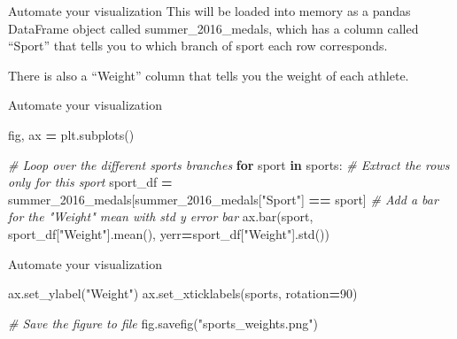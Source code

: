 \documentclass[
  ignorenonframetext,
]{beamer}
\newenvironment{Shaded}{\begin{snugshade}}{\end{snugshade}}
\newcommand{\CommentTok}[1]{\textcolor[rgb]{0.56,0.35,0.01}{\textit{#1}}}
\newcommand{\ControlFlowTok}[1]{\textcolor[rgb]{0.13,0.29,0.53}{\textbf{#1}}}
\newcommand{\DecValTok}[1]{\textcolor[rgb]{0.00,0.00,0.81}{#1}}
\newcommand{\KeywordTok}[1]{\textcolor[rgb]{0.13,0.29,0.53}{\textbf{#1}}}
\newcommand{\NormalTok}[1]{#1}
\newcommand{\OperatorTok}[1]{\textcolor[rgb]{0.81,0.36,0.00}{\textbf{#1}}}
\newcommand{\StringTok}[1]{\textcolor[rgb]{0.31,0.60,0.02}{#1}}
\begin{document}
\begin{frame}{Automate your visualization}
\label{automate-your-visualization-2}
This will be loaded into memory as a pandas DataFrame object called
summer\_2016\_medals, which has a column called ``Sport'' that tells you
to which branch of sport each row corresponds.

There is also a ``Weight'' column that tells you the weight of each
athlete.
\end{frame}

\begin{frame}[fragile]{Automate your visualization}
\label{automate-your-visualization-3}

\begin{Shaded}
\begin{Highlighting}[]
\NormalTok{fig, ax }\OperatorTok{=}\NormalTok{ plt.subplots()}

\CommentTok{\# Loop over the different sports branches}
\ControlFlowTok{for}\NormalTok{ sport }\KeywordTok{in}\NormalTok{ sports:}
  \CommentTok{\# Extract the rows only for this sport}
\NormalTok{  sport\_df }\OperatorTok{=}\NormalTok{ summer\_2016\_medals[summer\_2016\_medals[}\StringTok{"Sport"}\NormalTok{] }\OperatorTok{==}\NormalTok{ sport]}
  \CommentTok{\# Add a bar for the "Weight" mean with std y error bar}
\NormalTok{  ax.bar(sport, sport\_df[}\StringTok{"Weight"}\NormalTok{].mean(), yerr}\OperatorTok{=}\NormalTok{sport\_df[}\StringTok{"Weight"}\NormalTok{].std())}
\end{Highlighting}
\end{Shaded}
\end{frame}

\begin{frame}[fragile]{Automate your visualization}
\label{automate-your-visualization-4}

\begin{Shaded}
\begin{Highlighting}[]
\NormalTok{ax.set\_ylabel(}\StringTok{"Weight"}\NormalTok{)}
\NormalTok{ax.set\_xticklabels(sports, rotation}\OperatorTok{=}\DecValTok{90}\NormalTok{)}

\CommentTok{\# Save the figure to file}
\NormalTok{fig.savefig(}\StringTok{"sports\_weights.png"}\NormalTok{)}
\end{Highlighting}
\end{Shaded}
\end{frame}
\end{document}
